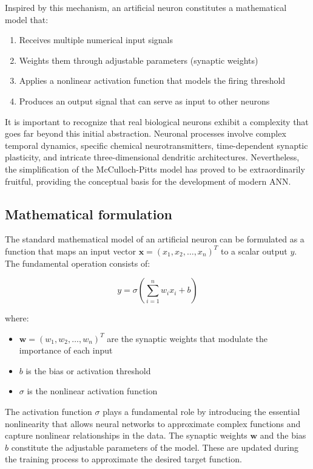 Inspired by this mechanism, an artificial neuron constitutes a mathematical model that:
\begin{enumerate}
	\item Receives multiple numerical input signals
	\item Weights them through adjustable parameters (synaptic weights)
	\item Applies a nonlinear activation function that models the firing threshold
	\item Produces an output signal that can serve as input to other neurons
\end{enumerate}

It is important to recognize that real biological neurons exhibit a complexity that goes far beyond this initial abstraction. Neuronal processes involve complex temporal dynamics, specific chemical neurotransmitters, time-dependent synaptic plasticity, and intricate three-dimensional dendritic architectures. Nevertheless, the simplification of the McCulloch-Pitts model has proved to be extraordinarily fruitful, providing the conceptual basis for the development of modern \gls{ANN}.

\subsection{Mathematical formulation}

The standard mathematical model of an artificial neuron can be formulated as a function that maps an input vector \(\mathbf{x} = (x_1, x_2, \ldots, x_n)^T\) to a scalar output \(y\). The fundamental operation consists of:

\begin{equation}
	y = \sigma\left(\sum_{i=1}^{n} w_i x_i + b\right)
	\label{eq:neuron}
\end{equation}

where:
\begin{itemize}
	\item \(\mathbf{w} = (w_1, w_2, \ldots, w_n)^T\) are the synaptic weights that modulate the importance of each input
	\item \(b\) is the bias or activation threshold
	\item \(\sigma\) is the nonlinear activation function
\end{itemize}

The activation function \(\sigma\) plays a fundamental role by introducing the essential nonlinearity that allows neural networks to approximate complex functions and capture nonlinear relationships in the data. The synaptic weights \(\mathbf{w}\) and the bias \(b\) constitute the adjustable parameters of the model. These are updated during the training process to approximate the desired target function.


